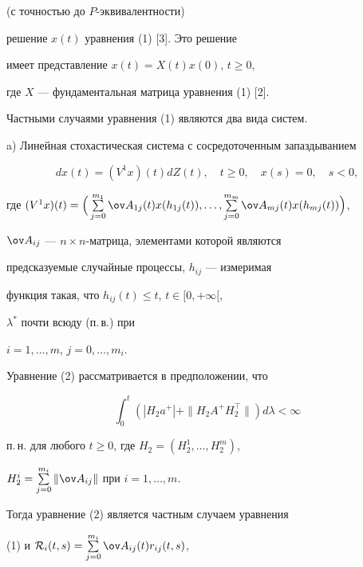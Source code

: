 (с точностью до $P$-эквивалентности) 


решение $x(t)$ уравнения (1) [3]. Это решение


имеет представление $x(t) = X(t)x(0)$, $t \ge 0$, 


где $X$ --- фундаментальная матрица уравнения (1) [2]. 





Частными случаями уравнения (1) являются два вида систем.





a) Линейная стохастическая система с сосредоточенным запаздыванием


\begin{equation}


dx(t) = (V^1x)(t)dZ(t),\quad t \ge 0, \quad


x(s) = 0,\quad s < 0, 


\end{equation}


где $(V^1x)(t) =


\Big(\sum \limits_{j=0}^{m_1}\ov A_{1j}(t)x(h_{1j}(t)),\dotsc, 


\sum \limits_{j=0}^{m_m}\ov A_{mj}(t)x(h_{mj}(t))\Big)$, 


$\ov A_{ij}$ --- $n\times n$-матрица, элементами которой являются 


предсказуемые случайные процессы, $h_{ij}$ --- измеримая 


функция такая, что $h_{ij}(t) \le t$, $t \in [0, +\infty [$,


$\lambda^*$ почти всюду (п.\,в.) при 


$i = 1,\dotsc, m$, $j = 0,\dotsc, m_i$.





Уравнение (2) рассматривается в предположении, что 


$$


\int_0^t(|H_2a^+| + \|H_2A^+H_2^\top \|)d\lambda < \infty


$$


п.\,н. для любого $t \ge 0$, где $H_2 = (H_2^1,\dotsc, H_2^m)$, 


$H_2^i = \sum \limits_{j=0}^{m_i}\|\ov A_{ij}\|$ при $i = 1,\dotsc, m$. 


Тогда уравнение (2) является частным случаем уравнения 


(1) и ${\cal R}_i(t,s)=\sum\limits_{j=0}^{m_i}\ov A_{ij}(t)r_{ij}(t,s)$, 


